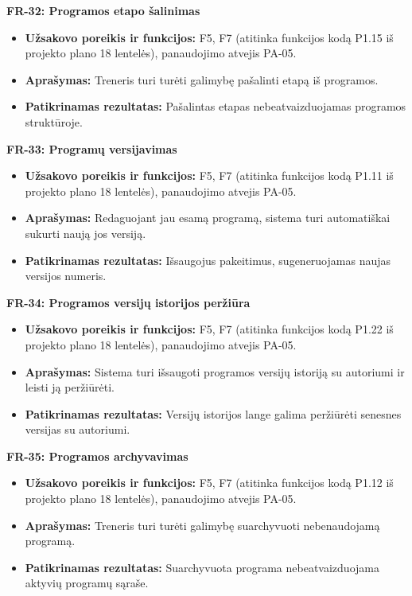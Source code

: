 \vspace{0.3cm}
\noindent\textbf{FR-32: Programos etapo šalinimas}
\begin{itemize}
    \item \textbf{Užsakovo poreikis ir funkcijos:} F5, F7 (atitinka funkcijos kodą P1.15 iš projekto plano 18 lentelės), panaudojimo atvejis PA-05.
    \item \textbf{Aprašymas:} Treneris turi turėti galimybę pašalinti etapą iš programos.
    \item \textbf{Patikrinamas rezultatas:} Pašalintas etapas nebeatvaizduojamas programos struktūroje.
\end{itemize}

\vspace{0.3cm}
\noindent\textbf{FR-33: Programų versijavimas}
\begin{itemize}
    \item \textbf{Užsakovo poreikis ir funkcijos:} F5, F7 (atitinka funkcijos kodą P1.11 iš projekto plano 18 lentelės), panaudojimo atvejis PA-05.
    \item \textbf{Aprašymas:} Redaguojant jau esamą programą, sistema turi automatiškai sukurti naują jos versiją.
    \item \textbf{Patikrinamas rezultatas:} Išsaugojus pakeitimus, sugeneruojamas naujas versijos numeris.
\end{itemize}

\vspace{0.3cm}
\noindent\textbf{FR-34: Programos versijų istorijos peržiūra}
\begin{itemize}
    \item \textbf{Užsakovo poreikis ir funkcijos:} F5, F7 (atitinka funkcijos kodą P1.22 iš projekto plano 18 lentelės), panaudojimo atvejis PA-05.
    \item \textbf{Aprašymas:} Sistema turi išsaugoti programos versijų istoriją su autoriumi ir leisti ją peržiūrėti.
    \item \textbf{Patikrinamas rezultatas:} Versijų istorijos lange galima peržiūrėti senesnes versijas su autoriumi.
\end{itemize}

\vspace{0.3cm}
\noindent\textbf{FR-35: Programos archyvavimas}
\begin{itemize}
    \item \textbf{Užsakovo poreikis ir funkcijos:} F5, F7 (atitinka funkcijos kodą P1.12 iš projekto plano 18 lentelės), panaudojimo atvejis PA-05.
    \item \textbf{Aprašymas:} Treneris turi turėti galimybę suarchyvuoti nebenaudojamą programą.
    \item \textbf{Patikrinamas rezultatas:} Suarchyvuota programa nebeatvaizduojama aktyvių programų sąraše.
\end{itemize}

